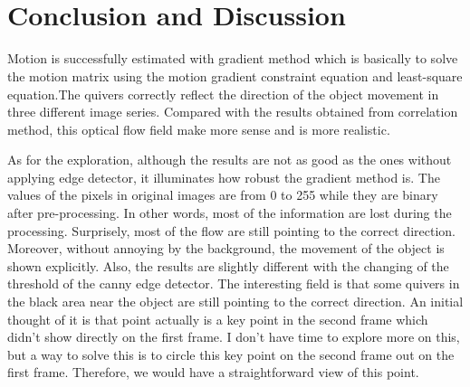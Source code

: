 \documentclass[11pt]{article}
\begin{document}
    \begin{center}
    \end{center}
    { \hspace*{\fill} \\}
    
    \begin{center}
    \end{center}
    { \hspace*{\fill} \\}
    
    \hypertarget{conclusion-and-discussion}{%
\section{Conclusion and Discussion}\label{conclusion-and-discussion}}

    Motion is successfully estimated with gradient method which is basically
to solve the motion matrix using the motion gradient constraint equation
and least-square equation.The quivers correctly reflect the direction of
the object movement in three different image series. Compared with the
results obtained from correlation method, this optical flow field make
more sense and is more realistic.

As for the exploration, although the results are not as good as the ones
without applying edge detector, it illuminates how robust the gradient
method is. The values of the pixels in original images are from 0 to 255
while they are binary after pre-processing. In other words, most of the
information are lost during the processing. Surprisely, most of the flow
are still pointing to the correct direction. Moreover, without annoying
by the background, the movement of the object is shown explicitly. Also,
the results are slightly different with the changing of the threshold of
the canny edge detector. The interesting field is that some quivers in
the black area near the object are still pointing to the correct
direction. An initial thought of it is that point actually is a key
point in the second frame which didn't show directly on the first frame.
I don't have time to explore more on this, but a way to solve this is to
circle this key point on the second frame out on the first frame.
Therefore, we would have a straightforward view of this point.


    
    
    
    
\end{document}
